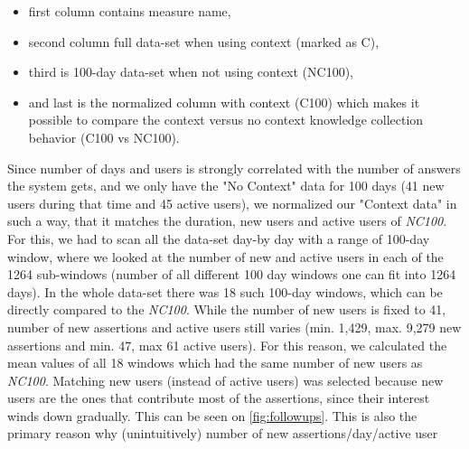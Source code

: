 \begin{itemize}
\item first column contains measure name,
\item second column full data-set when using context (marked as C),
\item third is 100-day data-set when not using context (NC100),
\item and last is the normalized column with context (C100) which makes it 
possible to compare the context versus no context knowledge collection behavior (C100 vs NC100).
\end{itemize}

Since number of days and users is strongly correlated with the number of 
answers the system gets, and we only have the "No Context" data for 100 days 
(41 new users during that time and 45 active users), we normalized our 
"Context data" in such a way, that it matches the duration, new users and 
active users of \emph{NC100}. For this, we had to scan all the data-set 
day-by day with a range of 100-day window, where we looked at the number of new 
and active users in each of the 1264 sub-windows (number of all different 
100 day windows one can fit into 1264 days). In the whole data-set there was 
18 such 100-day windows, which can be directly compared to the \emph{NC100}. 
While the number of new users is fixed to 41, number of new assertions and 
active users still varies (min. 1,429, max. 9,279 new assertions and min. 47, 
max 61 active users). For this reason, we calculated the mean values of all 
18 windows which had the same number of new users as \emph{NC100}. Matching 
new users (instead of active users) was selected because new users are the
ones that contribute most of the assertions, since their interest winds down 
gradually. This can be seen on \autoref{fig:followups}. This is also the 
primary reason why (unintuitively) number of new assertions/day/active user 
